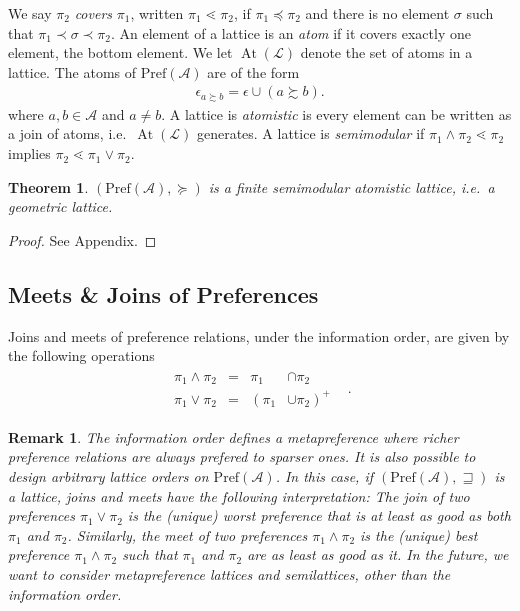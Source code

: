 \documentclass[conference]{ieeeconf}
\newcommand{\A}{\mathcal{A}}
\renewcommand{\P}{\mathrm{Pref}}
\renewcommand{\L}{\mathcal{L}}
\newcommand{\prefers}{\succsim}
\newcommand{\metaprefers}{\sqsupseteq}
\newcommand{\join}{\vee}
\newcommand{\meet}{\wedge}
\DeclareMathOperator{\Atoms}{At}
\newtheorem{theorem}{Theorem}
\newtheorem{remark}{Remark}
\begin{document}
We say $\pi_2$ \emph{covers} $\pi_1$, written $\pi_1 \lessdot \pi_2$, if $\pi_1 \preceq \pi_2$ and there is no element $\sigma$ such that $\pi_1 \prec \sigma \prec \pi_2$. An element of a lattice is an \emph{atom} if it covers exactly one element, the bottom element. We let $\Atoms(\L)$ denote the set of atoms in a lattice. The atoms of $\P(\A)$ are of the form
\begin{align*}
    \epsilon_{a \prefers b} = \epsilon \cup (a \prefers b).
\end{align*}
where $a, b \in \A$ and $a \neq b$.
A lattice is \emph{atomistic} is every element can be written as a join of atoms, i.e.~$\Atoms(\L)$ generates.
A lattice is \emph{semimodular} if $\pi_1 \meet \pi_2 \lessdot \pi_2$ implies $\pi_2 \lessdot \pi_1 \join \pi_2$.

\begin{theorem}
    $(\P(\A), \succeq)$ is a finite semimodular atomistic lattice, i.e.~a \emph{geometric lattice}.
\end{theorem}
\begin{proof}
See Appendix.
\end{proof}

\subsection{Meets \& Joins of Preferences}
Joins and meets of preference relations, under the information order, are given by the following operations
\begin{align}
    \begin{aligned}
        \pi_1 \meet \pi_2 &=& \pi_1 &\cap \pi_2& \\
 \pi_1 \join \pi_2 &=&  \left(\pi_1  \right. &\left. \cup \pi_2  \right)^{+}
    \end{aligned}. \label{eq:join-meets}
\end{align}

\begin{remark}
    The information order defines a metapreference where richer preference relations are always prefered to sparser ones. It is also possible to design arbitrary lattice orders on $\P(\A)$. In this case, if $(\P(\A), \metaprefers)$ is a lattice, joins and meets have the following interpretation: The join of two preferences $\pi_1 \join \pi_2$ is the (unique) worst preference that is at least as good as both $\pi_1$ and $\pi_2$. Similarly, the meet of two preferences $\pi_1 \meet \pi_2$ is the (unique) best preference $\pi_1 \meet \pi_2$ such that $\pi_1$ and $\pi_2$ are as least as good as it. In the future, we want to consider metapreference lattices and semilattices, other than the information order.
\end{remark}
\end{document}
